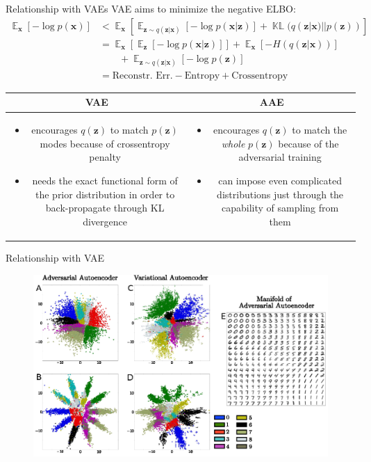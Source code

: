 \documentclass[10pt]{beamer}
\DeclareMathOperator{\E}{\mathbb E}
\DeclareMathOperator{\KL}{\mathbb{KL}}
\newcommand{\vect}[1]{\boldsymbol{#1}} %
\begin{document}
\begin{frame}{Relationship with VAEs}
VAE aims to minimize the negative ELBO:
\begin{align*}
  \E_{\vect x}[-\log p(\vect x)] 
    &< \E_{\vect x}\left[ \E_{\vect z \sim q(\vect z | \vect x)}[-\log p(\vect x | \vect z)] + \KL(q(\vect z | \vect x) || p(\vect z)) \right] \\
    &= \E_{\vect x}\left[ \E_{\vect z}[-\log p(\vect x | \vect z)] \right] + \E_{\vect x}[- H(q(\vect z | \vect x))] \\ 
    &\qquad + \E_{\vect z \sim q(\vect z | \vect x)}[-\log p(\vect z)] \\
    &= \text{Reconstr. Err.} - \text{Entropy} + \text{Crossentropy}
\end{align*}
\begin{table}
  \begin{tabular}{c c}
    \textbf{VAE} & \textbf{AAE} \\ \hline
  \parbox{0.5\linewidth}{\begin{itemize}
      \item encourages $ q(\vect z) $ to match $ p(\vect z) $ modes because of crossentropy penalty
      \item needs the exact functional form of the prior distribution in order to back-propagate through KL divergence
  \end{itemize}} &
  \parbox{0.45\linewidth}{\begin{itemize}
      \item encourages $ q(\vect z) $ to match the \textit{whole} $ p(\vect z) $ because of the adversarial training
      \item can impose even complicated distributions just through the capability of sampling from them
  \end{itemize}} \\
  \end{tabular}
\end{table}
\end{frame}

\begin{frame}{Relationship with VAE}
\begin{figure}
  \centering
  \includegraphics[width=0.8\linewidth]{../images/aae-embedding-01.png}
\end{figure}
\end{frame}
\end{document}
